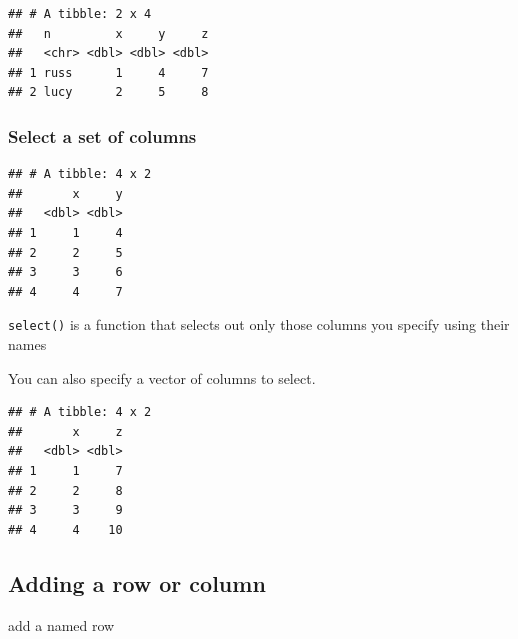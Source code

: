 \documentclass[12pt,]{book}
\newenvironment{Shaded}{\begin{snugshade}}{\end{snugshade}}
\newcommand{\DataTypeTok}[1]{\textcolor[rgb]{0.13,0.29,0.53}{#1}}
\newcommand{\DecValTok}[1]{\textcolor[rgb]{0.00,0.00,0.81}{#1}}
\newcommand{\KeywordTok}[1]{\textcolor[rgb]{0.13,0.29,0.53}{\textbf{#1}}}
\newcommand{\NormalTok}[1]{#1}
\newcommand{\OperatorTok}[1]{\textcolor[rgb]{0.81,0.36,0.00}{\textbf{#1}}}
\newcommand{\StringTok}[1]{\textcolor[rgb]{0.31,0.60,0.02}{#1}}
\begin{document}
\begin{verbatim}
## # A tibble: 2 x 4
##   n         x     y     z
##   <chr> <dbl> <dbl> <dbl>
## 1 russ      1     4     7
## 2 lucy      2     5     8
\end{verbatim}

\hypertarget{select-a-set-of-columns}{%
\subsubsection{Select a set of columns}\label{select-a-set-of-columns}}

\begin{Shaded}
\end{Shaded}

\begin{verbatim}
## # A tibble: 4 x 2
##       x     y
##   <dbl> <dbl>
## 1     1     4
## 2     2     5
## 3     3     6
## 4     4     7
\end{verbatim}

\texttt{select()} is a function that selects out only those columns you specify using their names

You can also specify a vector of columns to select.

\begin{Shaded}
\end{Shaded}

\begin{verbatim}
## # A tibble: 4 x 2
##       x     z
##   <dbl> <dbl>
## 1     1     7
## 2     2     8
## 3     3     9
## 4     4    10
\end{verbatim}

\hypertarget{adding-a-row-or-column}{%
\subsection{Adding a row or column}\label{adding-a-row-or-column}}

add a named row

\begin{Shaded}
\end{Shaded}
\end{document}
